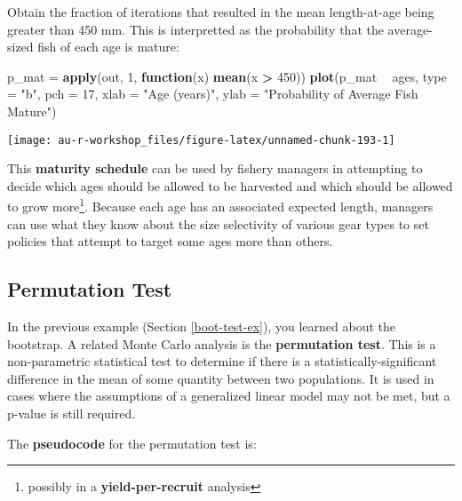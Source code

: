 \documentclass[]{book}
\newenvironment{Shaded}{\begin{snugshade}}{\end{snugshade}}
\newcommand{\KeywordTok}[1]{\textcolor[rgb]{0.13,0.29,0.53}{\textbf{#1}}}
\newcommand{\DataTypeTok}[1]{\textcolor[rgb]{0.13,0.29,0.53}{#1}}
\newcommand{\DecValTok}[1]{\textcolor[rgb]{0.00,0.00,0.81}{#1}}
\newcommand{\StringTok}[1]{\textcolor[rgb]{0.31,0.60,0.02}{#1}}
\newcommand{\ControlFlowTok}[1]{\textcolor[rgb]{0.13,0.29,0.53}{\textbf{#1}}}
\newcommand{\OperatorTok}[1]{\textcolor[rgb]{0.81,0.36,0.00}{\textbf{#1}}}
\newcommand{\NormalTok}[1]{#1}
\let\rmarkdownfootnote\footnote%
\def\footnote{\protect\rmarkdownfootnote}
\theoremstyle{definition}
\theoremstyle{definition}
\theoremstyle{definition}
\theoremstyle{remark}
\begin{document}
Obtain the fraction of iterations that resulted in the mean
length-at-age being greater than 450 mm. This is interpretted as the
probability that the average-sized fish of each age is mature:

\begin{Shaded}
\begin{Highlighting}[]
\NormalTok{p_mat =}\StringTok{ }\KeywordTok{apply}\NormalTok{(out, }\DecValTok{1}\NormalTok{, }\ControlFlowTok{function}\NormalTok{(x) }\KeywordTok{mean}\NormalTok{(x }\OperatorTok{>}\StringTok{ }\DecValTok{450}\NormalTok{))}
\KeywordTok{plot}\NormalTok{(p_mat }\OperatorTok{~}\StringTok{ }\NormalTok{ages, }\DataTypeTok{type =} \StringTok{"b"}\NormalTok{, }\DataTypeTok{pch =} \DecValTok{17}\NormalTok{,}
     \DataTypeTok{xlab =} \StringTok{"Age (years)"}\NormalTok{, }\DataTypeTok{ylab =} \StringTok{"Probability of Average Fish Mature"}\NormalTok{)}
\end{Highlighting}
\end{Shaded}

\begin{center}\texttt{[image: au-r-workshop\_files/figure-latex/unnamed-chunk-193-1]} \end{center}

This \textbf{maturity schedule} can be used by fishery managers in
attempting to decide which ages should be allowed to be harvested and
which should be allowed to grow more\footnote{possibly in a
  \textbf{yield-per-recruit} analysis}. Because each age has an
associated expected length, managers can use what they know about the
size selectivity of various gear types to set policies that attempt to
target some ages more than others.

\subsection{Permutation Test}\label{perm-test-ex}

In the previous example (Section \ref{boot-test-ex}), you learned about
the bootstrap. A related Monte Carlo analysis is the \textbf{permutation
test}. This is a non-parametric statistical test to determine if there
is a statistically-significant difference in the mean of some quantity
between two populations. It is used in cases where the assumptions of a
generalized linear model may not be met, but a p-value is still
required.

The \textbf{pseudocode} for the permutation test is:
\end{document}

